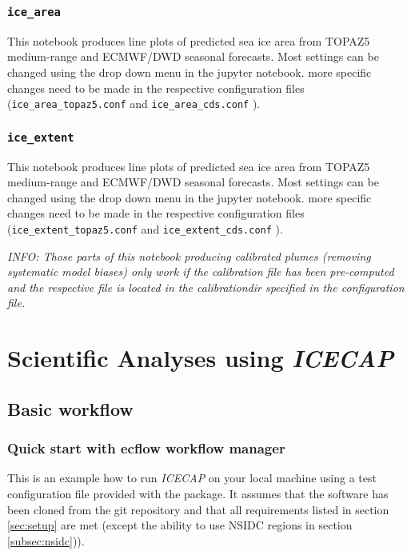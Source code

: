 \documentclass[DIV=10, parskip=full]{scrreprt}
\newcommand{\ice}{\textit{ICECAP}\xspace}
\newcommand{\info}[1]{\textit{INFO: #1}}
\begin{document}
\subsection{\texttt{ice\_area}}
This notebook produces line plots of predicted sea ice area from TOPAZ5 medium-range and ECMWF/DWD seasonal forecasts. Most settings can be changed using the drop down menu in the jupyter notebook. more specific changes need to be made in the respective configuration files (\texttt{ice\_area\_topaz5.conf} and \texttt{ice\_area\_cds.conf} ).

\subsection{\texttt{ice\_extent}}
This notebook produces line plots of predicted sea ice area from TOPAZ5 medium-range and ECMWF/DWD seasonal forecasts. Most settings can be changed using the drop down menu in the jupyter notebook. more specific changes need to be made in the respective configuration files (\texttt{ice\_extent\_topaz5.conf} and \texttt{ice\_extent\_cds.conf} ).

\info{Those parts of this notebook producing calibrated plumes (removing systematic model biases) only work if the calibration file has been pre-computed and the respective file is located in the calibrationdir specified in the configuration file.}\\

\chapter{Scientific Analyses using \ice}
\section{Basic workflow}
\subsection{Quick start with ecflow workflow manager} \label{sec:quick_start}
This is an example how to run \ice on your local machine using a test configuration file provided with the package. It assumes that the software has been cloned from the git repository and that all requirements listed in section \ref{sec:setup} are met (except the ability to use NSIDC regions in section \ref{subsec:nsidc})).
\end{document}
